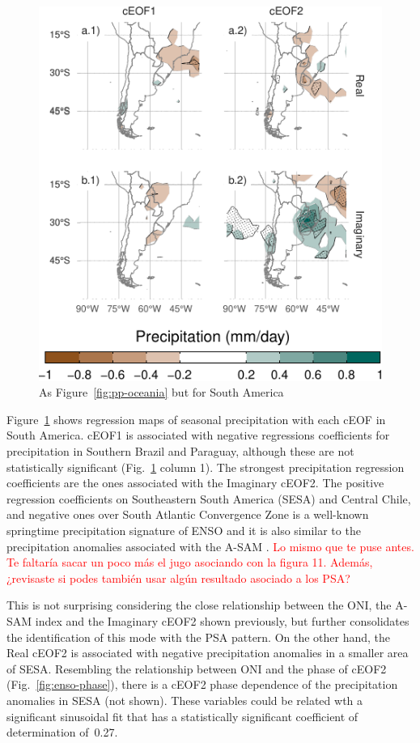 \documentclass[smallextended]{svjour3}       %
\begin{document}
\begin{figure}
\centering
\includegraphics{../figures/pp-america-1.pdf}
\caption{\label{fig:pp-america}As Figure~\ref{fig:pp-oceania} but for South America}
\end{figure}

Figure~\ref{fig:pp-america} shows regression maps of seasonal precipitation with each cEOF in South America. cEOF1 is associated with negative regressions coefficients for precipitation in Southern Brazil and Paraguay, although these are not statistically significant (Fig.~\ref{fig:pp-america} column 1). The strongest precipitation regression coefficients are the ones associated with the Imaginary cEOF2. The positive regression coefficients on Southeastern South America (SESA) and Central Chile, and negative ones over South Atlantic Convergence Zone is a well-known springtime precipitation signature of ENSO \citep{cai2020a} and it is also similar to the precipitation anomalies associated with the A-SAM \citep{campitelli2021}.
\textcolor{red}{Lo mismo que te puse antes. Te faltaría  sacar un poco más el jugo asociando con la figura 11. Además, ¿revisaste si podes también usar algún resultado asociado a los PSA? }

This is not surprising considering the close relationship between the ONI, the A-SAM index and the Imaginary cEOF2 shown previously, but further consolidates the identification of this mode with the PSA pattern.
On the other hand, the Real cEOF2 is associated with negative precipitation anomalies in a smaller area of SESA.
Resembling the relationship between ONI and the phase of cEOF2 (Fig.~\ref{fig:enso-phase}), there is a cEOF2 phase dependence of the precipitation anomalies in SESA (not shown).
These variables could be related wth a significant sinusoidal fit that has a statistically significant coefficient of determination of~0.27.
\end{document}
